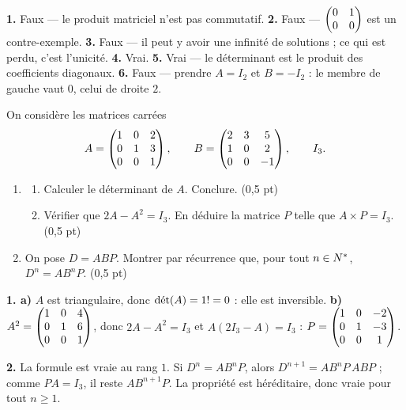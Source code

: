 \begin{corrige}[je me teste]
\textbf{1.} Faux — le produit matriciel n'est pas commutatif.
\textbf{2.} Faux — $\begin{pmatrix} 0 & 1 \\ 0 & 0 \end{pmatrix}$ est un contre-exemple.
\textbf{3.} Faux — il peut y avoir une infinité de solutions ; ce qui est
perdu, c'est l'unicité.
\textbf{4.} Vrai.
\textbf{5.} Vrai — le déterminant est le produit des coefficients diagonaux.
\textbf{6.} Faux — prendre $A = I_{2}$ et $B = -I_{2}$ : le membre de gauche
vaut $0$, celui de droite $2$.
\end{corrige}

\begin{commeaubac}
On considère les matrices carrées
\[
  A = \begin{pmatrix} 1 & 0 & 2 \\ 0 & 1 & 3 \\ 0 & 0 & 1 \end{pmatrix}, \qquad
  B = \begin{pmatrix} 2 & 3 & 5 \\ 1 & 0 & 2 \\ 0 & 0 & -1 \end{pmatrix}, \qquad I_{3}.
\]
\begin{enumerate}[label=\textbf{\arabic*.}, leftmargin=*, itemsep=0.25em]
  \item \begin{enumerate}[label=\textbf{\alph*)}, leftmargin=1.4em]
          \item Calculer le déterminant de $A$. Conclure.
                \hfill\textup{(0,5 pt)}
          \item Vérifier que $2A-A^{2} = I_{3}$. En déduire la matrice $P$
                telle que $A \times P = I_{3}$. \hfill\textup{(0,5 pt)}
        \end{enumerate}
  \item On pose $D = ABP$. Montrer par récurrence que, pour tout
        $n \in N^{*}$, $D^{n} = AB^{n}P$. \hfill\textup{(0,5 pt)}
\end{enumerate}
\end{commeaubac}

\begin{corrige}
\textbf{1. a)} $A$ est triangulaire, donc $\operatorname{d\acute{e}t}(A) = 1 != 0$ : elle est
inversible.
\textbf{b)} $A^{2} = \begin{pmatrix} 1 & 0 & 4 \\ 0 & 1 & 6 \\ 0 & 0 & 1 \end{pmatrix}$, donc
$2A-A^{2} = I_{3}$ et $A\left(2I_{3}-A\right) = I_{3}$ :
$P = \begin{pmatrix} 1 & 0 & -2 \\ 0 & 1 & -3 \\ 0 & 0 & 1 \end{pmatrix}$.

\textbf{2.} La formule est vraie au rang $1$. Si $D^{n} = AB^{n}P$, alors
$D^{n+1} = AB^{n}P\,ABP$ ; comme $PA = I_{3}$, il reste $AB^{n+1}P$. La
propriété est héréditaire, donc vraie pour tout $n \geq 1$.
\end{corrige}

